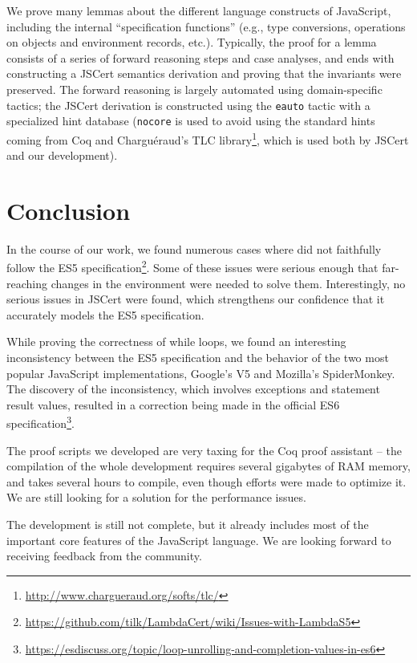 \documentclass{llncs}
\begin{document}
We prove many lemmas about the different language constructs
of JavaScript, including the internal ``specification functions''
(e.g., type conversions, operations on objects and environment
records, etc.). Typically, the proof for a lemma consists of
a series of forward reasoning steps and case analyses, and ends with
constructing a JSCert semantics derivation and proving that
the invariants were preserved. The forward reasoning is largely
automated using domain-specific tactics; the JSCert derivation
is constructed using the \texttt{eauto} tactic with a specialized
hint database (\texttt{nocore} is used to avoid using the standard
hints coming from Coq and Chargu\'eraud's TLC
library\footnote{\url{http://www.chargueraud.org/softs/tlc/}}, which is
used both by JSCert and our development).

\section{Conclusion}

In the course of our work, we found numerous cases where
\lambdajs{} did not faithfully follow the ES5 
specification\footnote{\url{https://github.com/tilk/LambdaCert/wiki/Issues-with-LambdaS5}}.
Some of these issues were serious enough that
far-reaching changes in the \lambdajs{} environment were needed
to solve them. Interestingly, no serious issues in JSCert were
found, which strengthens our confidence that it accurately models
the ES5 specification.

While proving the correctness of while loops, we found an interesting
inconsistency between the ES5 specification and the behavior
of the two most popular JavaScript implementations, Google's V5 and
Mozilla's SpiderMonkey. The discovery of the inconsistency,
which involves exceptions and statement result values,
resulted in a correction being made in the official ES6
specification\footnote{\url{https://esdiscuss.org/topic/loop-unrolling-and-completion-values-in-es6}}.

The proof scripts we developed are very taxing for the Coq
proof assistant -- the compilation of the whole development
requires several gigabytes of RAM memory, and takes several
hours to compile, even though efforts were made to optimize it.
We are still looking for a solution for the performance issues.

The development is still not complete, but it already
includes most of the important core features of the
JavaScript language. We are looking forward to receiving
feedback from the community.




\end{document}
